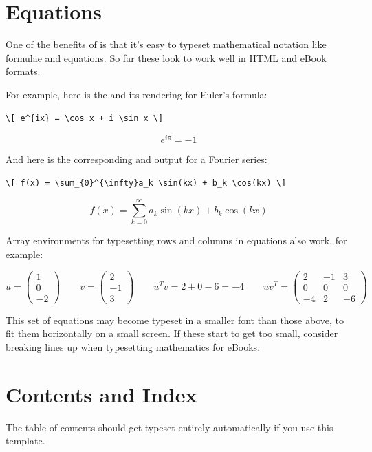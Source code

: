 \section{Equations}

One of the benefits of \latex is that it's easy to typeset mathematical notation like formulae and equations. So far these look to work well in HTML and eBook formats.

For example, here is the \tex and its rendering for Euler's formula:

\begin{Verbatim}[fontsize=\footnotesize]
\[ e^{ix} = \cos x + i \sin x \]
\end{Verbatim}
\[ e^{i\pi} = -1 \]

And here is the corresponding \tex and output for a Fourier series:

\begin{Verbatim}[fontsize=\footnotesize]
\[ f(x) = \sum_{0}^{\infty}a_k \sin(kx) + b_k \cos(kx) \]
\end{Verbatim}
\[ f(x) = \sum_{k=0}^{\infty}a_k \sin(kx) + b_k \cos(kx) \]

Array environments for typesetting rows and columns in equations also work, for example:

\[
u = \left( \begin{array}{c} 1 \\ 0 \\ -2 \end{array} \right) \qquad
v = \left( \begin{array}{c} 2 \\ -1 \\ 3 \end{array} \right) \qquad
u^T v = 2 + 0 - 6 = -4 \qquad
u v^T = \left( \begin{array}{ccc} 2 & -1 & 3 \\ 0 & 0 & 0 \\ -4 & 2 & -6 \end{array} \right)
\]

This set of equations may become typeset in a smaller font than those above, to fit them
horizontally on a small screen. If these start to get too small, consider breaking lines up
when typesetting mathematics for eBooks.

\section{Contents and Index}

The table of contents should get typeset entirely automatically if you use this template.


